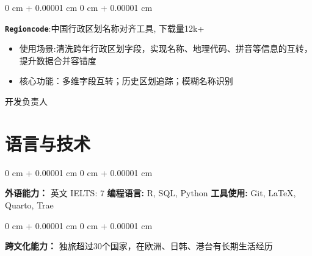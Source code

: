 \documentclass[10pt, letterpaper]{article}
\newenvironment{onecolentry}{
    \begin{adjustwidth}{
        0 cm + 0.00001 cm
    }{
        0 cm + 0.00001 cm
    }
}{
    \end{adjustwidth}
} %
\newenvironment{twocolentry}[2][]{
    \onecolentry
    \def\secondColumn{#2}
    \setcolumnwidth{\fill, 2.5 cm}
    \begin{paracol}{2}
}{
    \switchcolumn \raggedleft \secondColumn
    \end{paracol}
    \endonecolentry
} %
\begin{document}
        \begin{twocolentry}{
            开发负责人
        }
        \textbf{\texttt{Regioncode}}:中国行政区划名称对齐工具, 下载量12k+
        
        \begin{itemize}[
            topsep=0.005cm,   %
            parsep=0.005cm,   %
            partopsep=0pt,    %
            itemsep=0pt,      %
            leftmargin=0cm + 10pt
        ]
        \item 使用场景:清洗跨年行政区划字段，实现名称、地理代码、拼音等信息的互转，提升数据合并容错度

        \item 核心功能：多维字段互转；历史区划追踪；模糊名称识别

        \end{itemize}
        
    \end{twocolentry}



    
    \section{语言与技术}

        \begin{onecolentry}
            \textbf{外语能力：} 英文 IELTS: 7 \hspace{5em}
            \textbf{编程语言:} R, SQL, Python \hspace{5em}
            \textbf{工具使用:} Git, \LaTeX, Quarto, Trae
        \end{onecolentry}

        \begin{onecolentry}
            \textbf{跨文化能力：} 独旅超过30个国家，在欧洲、日韩、港台有长期生活经历\hspace{5em}
        \end{onecolentry}
\end{document}
